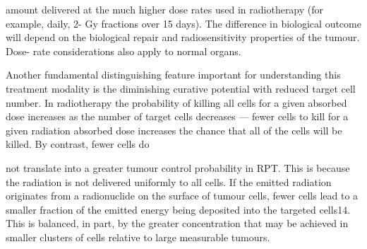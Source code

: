 \documentclass[
]{article}
\begin{document}
amount delivered at the much higher dose rates used in radiotherapy (for
example, daily, 2- Gy fractions over 15 days). The difference in
biological outcome will depend on the biological repair and
radiosensitivity properties of the tumour. Dose- rate considerations
also apply to normal organs.

Another fundamental distinguishing feature important for understanding
this treatment modality is the diminishing curative potential with
reduced target cell number. In radiotherapy the probability of killing
all cells for a given absorbed dose increases as the number of target
cells decreases --- fewer cells to kill for a given radiation absorbed
dose increases the chance that all of the cells will be killed. By
contrast, fewer cells do

not translate into a greater tumour control probability in RPT. This is
because the radiation is not delivered uniformly to all cells. If the
emitted radiation originates from a radionuclide on the surface of
tumour cells, fewer cells lead to a smaller fraction of the emitted
energy being deposited into the targeted cells14. This is balanced, in
part, by the greater concentration that may be achieved in smaller
clusters of cells relative to large measurable tumours.
\end{document}
